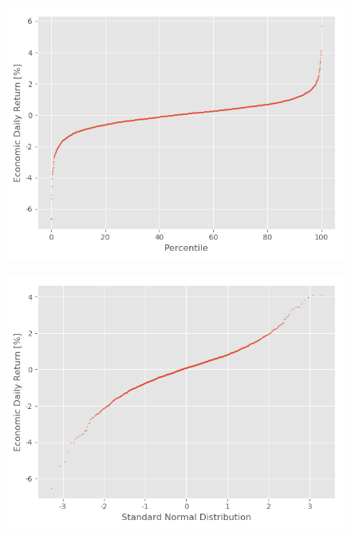 \begin{figure}
\centering
\begin{minipage}{.5\textwidth}
  \centering
  \includegraphics[scale=0.5]{Plot/PercentilePlot.png}
  \label{PercentilePlot}
\end{minipage}%
\begin{minipage}{.5\textwidth}
  \centering
  \includegraphics[scale=0.5]{Plot/QQPlot.png}
  \label{QQPlot}
\end{minipage}
\end{figure}



